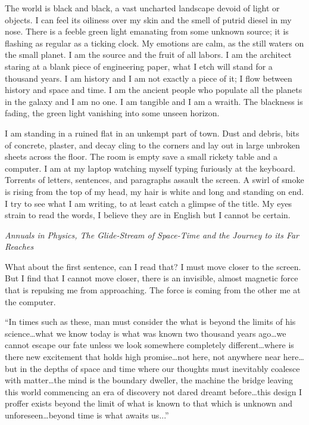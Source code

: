 The world is black and black, a vast uncharted landscape devoid of light
or objects. I can feel its oiliness over my skin and the smell of putrid
diesel in my nose. There is a feeble green light emanating from some
unknown source; it is flashing as regular as a ticking clock. My
emotions are calm, as the still waters on the small planet. I am the
source and the fruit of all labors. I am the architect staring at a
blank piece of engineering paper, what I etch will stand for a thousand
years. I am history and I am not exactly a piece of it; I flow between
history and space and time. I am the ancient people who populate all the
planets in the galaxy and I am no one. I am tangible and I am a wraith.
The blackness is fading, the green light vanishing into some unseen
horizon.

I am standing in a ruined flat in an unkempt part of town. Dust and
debris, bits of concrete, plaster, and decay cling to the corners and
lay out in large unbroken sheets across the floor. The room is empty
save a small rickety table and a computer. I am at my laptop watching
myself typing furiously at the keyboard. Torrents of letters, sentences,
and paragraphs assault the screen. A swirl of smoke is rising from the
top of my head, my hair is white and long and standing on end. I try to
see what I am writing, to at least catch a glimpse of the title. My eyes
strain to read the words, I believe they are in English but I cannot be
certain.

\emph{Annuals in Physics, The Glide-Stream of Space-Time and the Journey
to its Far Reaches}

What about the first sentence, can I read that? I must move closer to
the screen. But I find that I cannot move closer, there is an invisible,
almost magnetic force that is repulsing me from approaching. The force
is coming from the other me at the computer.

``In times such as these, man must consider the what is beyond the
limits of his science\ldots what we know today is what was known two
thousand years ago\ldots we cannot escape our fate unless we look
somewhere completely different\ldots where is there new excitement that
holds high promise\ldots not here, not anywhere near here\ldots but in
the depths of space and time where our thoughts must inevitably coalesce
with matter\ldots the mind is the boundary dweller, the machine the
bridge leaving this world commencing an era of discovery not dared
dreamt before\ldots this design I proffer exists beyond the limit of
what is known to that which is unknown and unforeseen\ldots beyond time
is what awaits us...''

